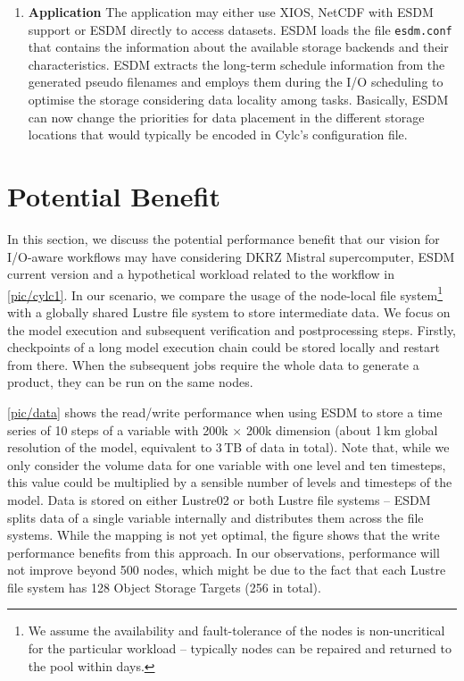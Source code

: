 \documentclass{superfri}
\begin{document}
\begin{enumerate}
  \item \textbf{Application}
  The application may either use XIOS, NetCDF with ESDM support or ESDM directly to access datasets.
  ESDM loads the file \texttt{esdm.conf} that contains the information about the available storage backends and their characteristics.
  ESDM extracts the long-term schedule information from the generated pseudo filenames and employs them during the I/O scheduling to optimise the storage considering data locality among tasks.
  Basically, ESDM can now change the priorities for data placement in the different storage locations that would typically be encoded in Cylc's configuration file.
\end{enumerate}

\section{Potential Benefit}
\label{sec:evaluation}

In this section, we discuss the potential performance benefit that our vision for I/O-aware workflows may have considering DKRZ Mistral supercomputer, ESDM current version and a hypothetical workload related to the workflow in \cref{pic/cylc1}.
In our scenario, we compare the usage of the node-local file system\footnote{%
We assume the availability and fault-tolerance of the nodes is non-uncritical for the particular workload -- typically nodes can be repaired and returned to the pool within days.} with a globally shared Lustre file system to store intermediate data.
We focus on the model execution and subsequent verification and postprocessing steps.
Firstly, checkpoints of a long model execution chain could be stored locally and restart from there.
When the subsequent jobs require the whole data to generate a product, they can be run on the same nodes.


\cref{pic/data} shows the read/write performance when using ESDM to store a time series of 10 steps of a variable with 200k $\times$ 200k dimension (about 1\,km global resolution of the model, equivalent to 3\,TB of data in total).
Note that, while we only consider the volume data for one variable with one level and ten timesteps, this value could be multiplied by a sensible number of levels and timesteps of the model.
Data is stored on either Lustre02 or both Lustre file systems -- ESDM splits data of a single variable internally and distributes them across the file systems.
While the mapping is not yet optimal, the figure shows that the write performance benefits from this approach.
In our observations, performance will not improve beyond 500 nodes, which might be due to the fact that each Lustre file system has 128 Object Storage Targets (256 in total).
\end{document}
